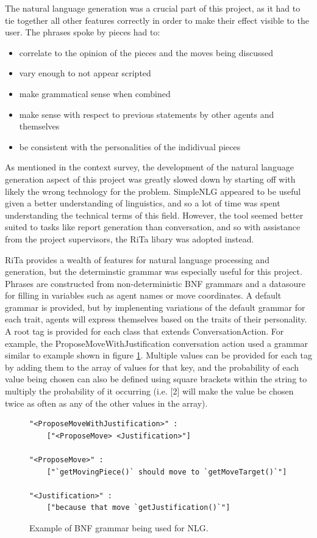 \documentclass[conference]{IEEEtran}
\begin{document}
The natural language generation was a crucial part of this project, as it had to tie together all other features correctly in order to make their effect visible to the user. The phrases spoke by pieces had to:
\begin{itemize}
	\item correlate to the opinion of the pieces and the moves being discussed
	\item vary enough to not appear scripted
	\item make grammatical sense when combined 
	\item make sense with respect to previous statements by other agents and themselves
	\item be consistent with the personalities of the indidivual pieces
\end{itemize}

As mentioned in the context survey, the development of the natural language generation aspect of this project was greatly slowed down by starting off with likely the wrong technology for the problem. SimpleNLG appeared to be useful given a better understanding of linguistics, and so a lot of time was spent understanding the technical terms of this field. However, the tool seemed better suited to tasks like report generation than conversation, and so with assistance from the project supervisors, the RiTa libary was adopted instead.

RiTa provides a wealth of features for natural language processing and generation, but the determinstic grammar was especially useful for this project. Phrases are constructed from non-deterministic BNF grammars and a datasoure for filling in variables such as agent names or move coordinates. A default grammar is provided, but by implenenting variations of the default grammar for each trait, agents will express themselves based on the traits of their personality. A root tag is provided for each class that extends ConversationAction. For example, the ProposeMoveWithJustification conversation action used a grammar similar to example shown in figure \ref{fig:bnf}. Multiple values can be provided for each tag by adding them to the array of values for that key, and the probability of each value being chosen can also be defined using square brackets within the string to multiply the probability of it occurring (i.e. [2] will make the value be chosen twice as often as any of the other values in the array).

\begin{figure}
\begin{lstlisting}[breaklines=true, stringstyle=\color{mauve}]
"<ProposeMoveWithJustification>" : 
	["<ProposeMove> <Justification>"]

"<ProposeMove>" : 
	["`getMovingPiece()` should move to `getMoveTarget()`"]

"<Justification>" : 
	["because that move `getJustification()`"]
\end{lstlisting}
\caption{Example of BNF grammar being used for NLG.}
\label{fig:bnf}
\end{figure}
\end{document}
